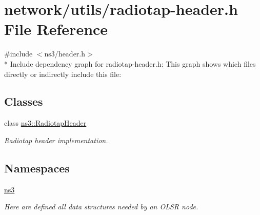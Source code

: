 \hypertarget{radiotap-header_8h}{}\section{network/utils/radiotap-\/header.h File Reference}
\label{radiotap-header_8h}
{\ttfamily \#include $<$ns3/header.\+h$>$}\\*
Include dependency graph for radiotap-\/header.h\+:
This graph shows which files directly or indirectly include this file\+:
\subsection*{Classes}
\begin{DoxyCompactItemize}
\item 
class \hyperlink{classns3_1_1RadiotapHeader}{ns3\+::\+Radiotap\+Header}
\begin{DoxyCompactList}\small\item\em Radiotap header implementation. \end{DoxyCompactList}\end{DoxyCompactItemize}
\subsection*{Namespaces}
\begin{DoxyCompactItemize}
\item 
 \hyperlink{namespacens3}{ns3}
\begin{DoxyCompactList}\small\item\em Here are defined all data structures needed by an O\+L\+SR node. \end{DoxyCompactList}\end{DoxyCompactItemize}
